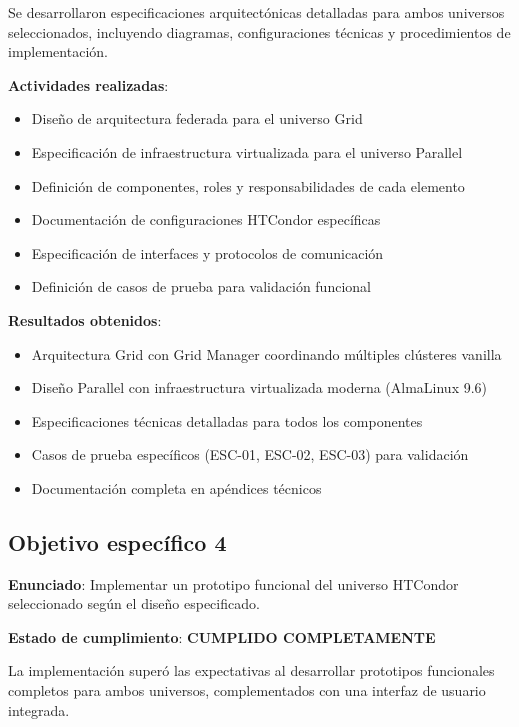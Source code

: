Se desarrollaron especificaciones arquitectónicas detalladas para ambos universos seleccionados, incluyendo diagramas, configuraciones técnicas y procedimientos de implementación.

\textbf{Actividades realizadas}:
\begin{itemize}
    \item Diseño de arquitectura federada para el universo Grid
    \item Especificación de infraestructura virtualizada para el universo Parallel
    \item Definición de componentes, roles y responsabilidades de cada elemento
    \item Documentación de configuraciones HTCondor específicas
    \item Especificación de interfaces y protocolos de comunicación
    \item Definición de casos de prueba para validación funcional
\end{itemize}

\textbf{Resultados obtenidos}:
\begin{itemize}
    \item Arquitectura Grid con Grid Manager coordinando múltiples clústeres vanilla
    \item Diseño Parallel con infraestructura virtualizada moderna (AlmaLinux 9.6)
    \item Especificaciones técnicas detalladas para todos los componentes
    \item Casos de prueba específicos (ESC-01, ESC-02, ESC-03) para validación
    \item Documentación completa en apéndices técnicos
\end{itemize}

\subsection{Objetivo específico 4}
\noindent

\textbf{Enunciado}: Implementar un prototipo funcional del universo HTCondor seleccionado según el diseño especificado.

\textbf{Estado de cumplimiento}: \textbf{CUMPLIDO COMPLETAMENTE}

La implementación superó las expectativas al desarrollar prototipos funcionales completos para ambos universos, complementados con una interfaz de usuario integrada.

